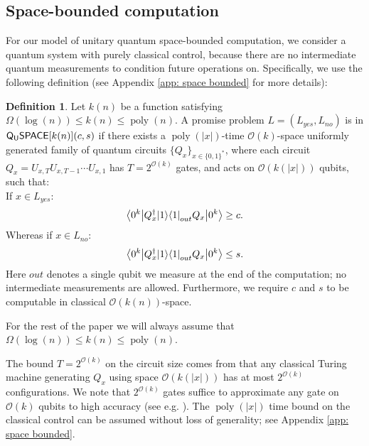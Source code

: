 \documentclass[11pt]{article}
\theoremstyle{definition}
\newtheorem{definition}[theorem]{Definition}
\theoremstyle{remark}
\newcommand\QSPACE{{\sf{Q_{U}SPACE}}}
\newcommand\bigoh{\mathcal{O}}
\DeclareMathOperator{\poly}{poly}
\begin{document}
\subsection{Space-bounded computation} \label{sec: space bounded computation}
For our model of unitary quantum space-bounded computation, we consider a quantum system with purely classical control, because there are no intermediate quantum measurements to condition future operations on. Specifically, we use the following definition (see Appendix \ref{app: space bounded} for more details):

\begin{definition} \label{def: qspace}
Let $k(n)$ be a function satisfying $\Omega(\log(n)) \le k(n) \le \poly(n)$. A promise problem $L=(L_{yes},L_{no})$ is in $\QSPACE[k(n)](c,s)$ if there exists a $\poly(|x|)$-time $\mathcal{O}(k)$-space uniformly generated family of quantum circuits $\{Q_x\}_{x\in\{0,1\}^*}$, where each circuit $Q_x=U_{x,T}U_{x,T-1}\cdots U_{x,1}$ has $T=2^{\mathcal{O}(k)}$ gates, and acts on $\mathcal{O}(k(|x|))$ qubits, such that:\\
 If $x \in L_{yes}$:
\begin{equation}
{\left\langle{0^k}\right\vert} Q^\dagger_x {\left\vert{1}\right\rangle}{\left\langle{1}\right\vert}_{out} Q_x {\left\vert{0^k}\right\rangle} \ge c.
\end{equation}
Whereas if $x \in L_{no}$:
\begin{equation}
{\left\langle{0^k}\right\vert} Q^\dagger_x {\left\vert{1}\right\rangle}{\left\langle{1}\right\vert}_{out} Q_x {\left\vert{0^k}\right\rangle} \le s.
\end{equation}
Here $out$ denotes a single qubit we measure at the end of the computation; no intermediate measurements are allowed.  
Furthermore, we require $c$ and $s$ to be computable in classical $\bigoh(k(n))$-space.
\end{definition}

For the rest of the paper we will always assume that $\Omega(\log(n)) \le k(n) \le \poly(n)$.

The bound $T=2^{\mathcal{O}(k)}$ on the circuit size comes from that any classical Turing machine generating $Q_x$ using space $\bigoh(k(|x|))$ has at most $2^{\mathcal{O}(k)}$ configurations. We note that $2^{\mathcal{O}(k)}$ gates suffice to approximate any gate on $\bigoh(k)$ qubits to high accuracy (see e.g. \cite[Chapter~4]{nc00}). The $\poly(|x|)$ time bound on the classical control can be assumed without loss of generality; see Appendix \ref{app: space bounded}.
\end{document}
